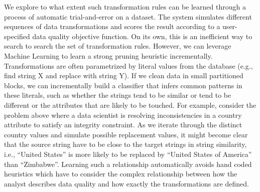 We explore to what extent such transformation rules can be learned through a process of automatic trial-and-error on a dataset.
The system simulates different sequences of data transformations and scores the result according to a user-specified data quality objective function.
On its own, this is an inefficient way to search to search the set of transformation rules.
However, we can leverage Machine Learning to learn a strong pruning heuristic incrementally.
Transformations are often parametrized by literal values from the database (e.g., find string X and replace with string Y).
If we clean data in small partitioned blocks, we can incrementally build a classifier that infers common patterns in these literals, such as whether the strings tend to be similar or tend to be different or the attributes that are likely to be touched.
For example, consider the problem above where a data scientist is resolving inconsistencies in a \textsf{country} attribute to satisfy an integrity constraint.
As we iterate through the distinct \textsf{country} values and simulate possible replacement values, it might become clear that the source string have to be close to the target strings in string similarity, i.e., ``United States'' is more likely to be replaced by ``United States of America'' than ``Zimbabwe''.
Learning such a relationship automatically avoids hand coded heuristics which have to consider the complex relationship between how the analyst describes data quality and how exactly the transformations are defined.

